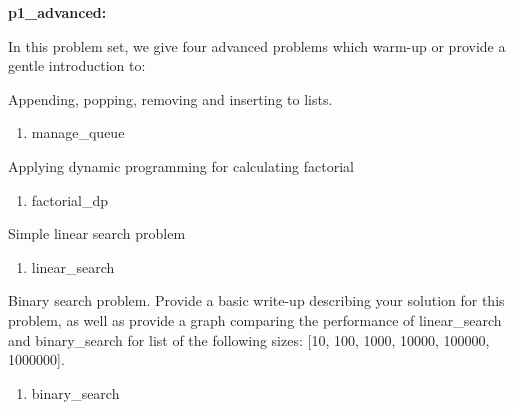 \documentclass{hw}
\begin{document}
\begin{challenge}
\textbf{p1\_advanced:}

In this problem set, we give four advanced problems which warm-up or provide a gentle introduction to:

\begin{subproblem}
Appending, popping, removing and inserting to lists.
\begin{enumerate}
    \item manage\_queue
\end{enumerate}
\end{subproblem}

\begin{subproblem}
Applying dynamic programming for calculating factorial
\begin{enumerate}
    \item factorial\_dp
\end{enumerate}
\end{subproblem}

\begin{subproblem}
Simple linear search problem
\begin{enumerate}
    \item linear\_search
\end{enumerate}
\end{subproblem}

\begin{subproblem}
Binary search problem. Provide a basic write-up describing your solution for this problem, as well as provide a graph comparing the performance of linear\_search and binary\_search for list of the following sizes: [10, 100, 1000, 10000, 100000, 1000000].
\begin{enumerate}
    \item binary\_search
\end{enumerate}
\end{subproblem}

\end{challenge}
\end{document}
